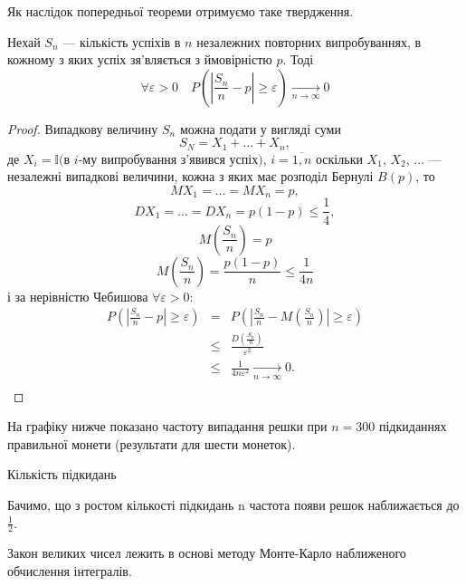 Як наслідок попередньої теореми отримуємо таке твердження.

\begin{theorem}    
    Нехай $S_n$ --- кількість успіхів в $n$ незалежних
    повторних випробуваннях,
    в кожному з яких успіх зя'вляється з ймовірністю $p$.
    Тоді
    \begin{equation}
        \label{Bernylli_theorem_equation}
        \forall \varepsilon > 0 \quad
        P\left(\left| \dfrac{S_n}{n} - p \right| \geqslant \varepsilon\right) \xrightarrow[n \rightarrow \infty]{} 0
    \end{equation}
\end{theorem}
\begin{proof}
    Випадкову величину $S_n$ можна подати у вигляді суми
    $$S_N = X_1 + ... + X_n,$$
    де $X_i = \mathbb{I}($в $i$-му випробування з'явився успіх$)$,
    $i = \overline{1, n}$
    оскільки $X_1$, $X_2$, ... --- незалежні випадкові величини, кожна
    з яких має розподіл Бернулі $B(p)$, то
    $$MX_1 = ... = MX_n = p,$$
    $$DX_1 = ... = DX_n = p(1-p) \leqslant \dfrac{1}{4},$$
    $$M\left(\dfrac{S_n}{n}\right) = p$$
    $$M\left(\dfrac{S_n}{n}\right) = \dfrac{p(1-p)}{n} \leqslant \dfrac{1}{4n}$$
    і за нерівністю Чебишова $\forall \varepsilon > 0$:
    $$\begin{array}{rcl}
        P\left(\left|\frac{S_n}{n} - p\right| \geqslant \varepsilon \right)& = & 
            P\left(\left|\frac{S_n}{n} - M(\frac{S_n}{n})\right| \geqslant \varepsilon \right)\\
        & \leqslant & \frac{D\left(\frac{S_n}{n}\right)}{\varepsilon^2} \\
        & \leqslant & \frac{1}{4n\varepsilon^2} \xrightarrow[n \rightarrow \infty]{} 0. \\
    \end{array}$$
\end{proof}

На графіку нижче показано частоту випадання
решки при $n = 300$ підкиданнях правильної
монети (результати для шести монеток).

\beautifulImage

Кількість підкидань

Бачимо, що з ростом кількості підкидань n частота
появи решок наближається до $\frac{1}{2}$.

Закон великих чисел лежить в основі методу
Монте-Карло наближеного обчислення інтегралів.

